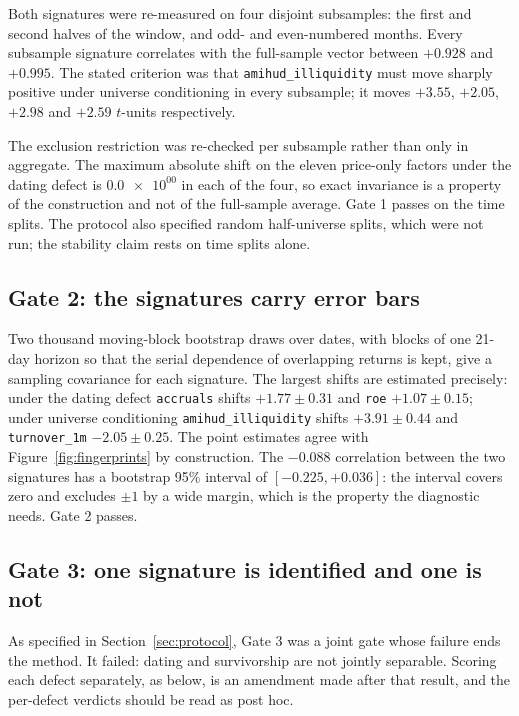 \documentclass[11pt]{article}
\newcommand{\fac}[1]{\texttt{\small #1}}
\begin{document}
Both signatures were re-measured on four disjoint subsamples: the first and second
halves of the window, and odd- and even-numbered months. Every subsample signature
correlates with the full-sample vector between $+0.928$ and $+0.995$. The stated
criterion was that \fac{amihud\_illiquidity} must move sharply positive under
universe conditioning in every subsample; it moves $+3.55$, $+2.05$, $+2.98$ and
$+2.59$ $t$-units respectively.

The exclusion restriction was re-checked per subsample rather than only in
aggregate. The maximum absolute shift on the eleven price-only factors under the
dating defect is $\num{0.0e+00}$ in each of the four, so exact invariance is a
property of the construction and not of the full-sample average. Gate 1 passes on the
time splits. The protocol also specified random half-universe splits, which were not
run; the stability claim rests on time splits alone.

\subsection{Gate 2: the signatures carry error bars}

Two thousand moving-block bootstrap draws over dates, with blocks of one 21-day
horizon so that the serial dependence of overlapping returns is kept, give a sampling
covariance for each signature. The largest shifts are estimated precisely: under the
dating defect \fac{accruals} shifts $+1.77 \pm 0.31$ and \fac{roe} $+1.07 \pm 0.15$;
under universe conditioning \fac{amihud\_illiquidity} shifts $+3.91 \pm 0.44$ and
\fac{turnover\_1m} $-2.05 \pm 0.25$. The point estimates agree with
Figure~\ref{fig:fingerprints} by construction. The $-0.088$ correlation between the two
signatures has a bootstrap 95\% interval of $[-0.225, +0.036]$: the interval covers
zero and excludes $\pm 1$ by a wide margin, which is the property the diagnostic needs.
Gate 2 passes.

\subsection{Gate 3: one signature is identified and one is not}

As specified in Section~\ref{sec:protocol}, Gate 3 was a joint gate whose failure ends
the method. It failed: dating and survivorship are not jointly separable. Scoring each
defect separately, as below, is an amendment made after that result, and the per-defect
verdicts should be read as post hoc.
\end{document}
